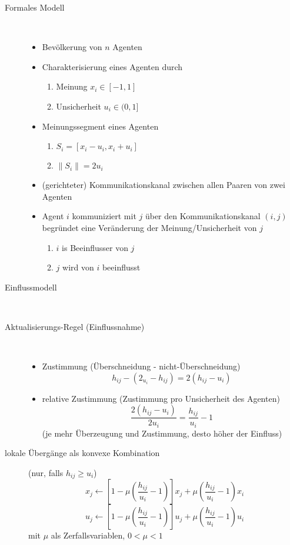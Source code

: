 	\begin{description}
		\item[Formales Modell]\ \\\vspace*{-\baselineskip}
			\begin{itemize}
				\item Bevölkerung von $n$ Agenten
				\item Charakterisierung eines Agenten durch
					\begin{enumerate}
						\item Meinung $x_i\in[-1,1]$
						\item Unsicherheit $u_i\in(0,1]$
					\end{enumerate}
				\item Meinungssegment eines Agenten
					\begin{enumerate}
						\item $S_i=[x_i-u_i,x_i+u_i]$
						\item $\|S_i\|=2u_i$
					\end{enumerate}
				\item (gerichteter) Kommunikationskanal zwischen allen Paaren von zwei Agenten
					\begin{center}
					\end{center}
				\item Agent $i$ kommuniziert mit $j$ über den Kommunikationskanal $(i,j)$ begründet eine Veränderung der Meinung/Unsicherheit von $j$
					\begin{enumerate}
						\item $i$ is Beeinflusser von $j$
						\item $j$ wird von $i$ beeinflusst
					\end{enumerate}
			\end{itemize}
		\item[Einflussmodell]\ \\\vspace*{-\baselineskip}
			\begin{center}
			\end{center}
		\item[Aktualisierungs-Regel (Einflussnahme)]\ \\\vspace*{-\baselineskip}
			\begin{itemize}
				\item Zustimmung (Überschneidung - nicht-Überschneidung)
					\[h_{ij}-(2_{u_i}-h_{ij})=2(h_{ij}-u_i)\]
				\item relative Zustimmung (Zustimmung pro Unsicherheit des Agenten)
					\[\frac{2(h_{ij}-u_i)}{2u_i}=\frac{h_{ij}}{u_i}-1\]
					(je mehr Überzeugung und Zustimmung, desto höher der Einfluss)
			\end{itemize}
		\item[lokale Übergänge als konvexe Kombination] (nur, falls $h_{ij}\geq u_i$)
			\[x_j\leftarrow [1-\mu\left(\frac{h_{ij}}{u_i}-1\right)]x_j+\mu\left(\frac{h_{ij}}{u_i}-1\right)x_i\]
			\[u_j\leftarrow [1-\mu\left(\frac{h_{ij}}{u_i}-1\right)]u_j+\mu\left(\frac{h_{ij}}{u_i}-1\right)u_i\]
			mit $\mu$ als Zerfallsvariablen, $0<\mu<1$
	\end{description}